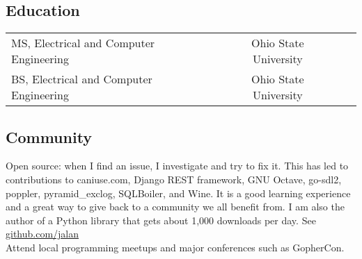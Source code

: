 \documentclass[12pt]{report}
\makeatletter
\renewcommand{\bullet}{$\vcenter{\hbox{~\huge$\cdot$~}}$}
\newenvironment{bullets}
{\tabularx{\textwidth}{ @{\bullet} X @{} }}
{\endtabularx}
\makeatother
\begin{document}
\subsection*{Education}
\begin{tabularx}{\textwidth}{ @{\bullet} l X c X r @{} }
MS, Electrical and Computer Engineering && Ohio State University \\
BS, Electrical and Computer Engineering && Ohio State University \\
\end{tabularx}

\subsection*{Community}
\begin{bullets}
Open source: when I find an issue, I investigate and try to fix it.
This has led to contributions to
	caniuse.com,
	Django REST framework,
	GNU Octave,
	go-sdl2,
	poppler,
	pyramid\_exclog,
	SQLBoiler,
	and
	Wine.
It is a good learning experience and a great way to give back to a community we all benefit from.
I am also the author of a Python library that gets about 1,000 downloads per day. See \href{https://github.com/jalan}{github.com/jalan} \\
Attend local programming meetups and major conferences such as GopherCon. \\
\end{bullets}
\end{document}
